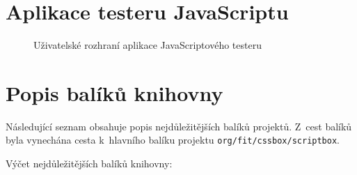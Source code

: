 \chapter{Aplikace testeru JavaScriptu}
\label{Annex.JavaScriptTester}

\begin{figure}[H]
  \begin{center}
    \caption{Uživatelské rozhraní aplikace JavaScriptového testeru}
    \label{Figure.JavaScriptTester}
  \end{center}
\end{figure}

\chapter{Popis balíků knihovny}
\label{Annex.packageDescription}

Následující seznam obsahuje popis nejdůležitějších balíků projektů. Z~cest balíků byla vynechána 
cesta k~hlavního balíku projektu \texttt{org/fit/cssbox/scriptbox}.

\bigskip

\noindent Výčet nejdůležitějších balíků knihovny:

